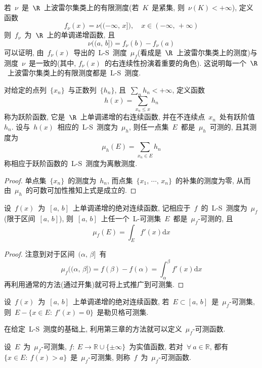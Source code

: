 \begin{Remark}
若~$\nu$~是~$\R$~上波雷尔集类上的有限测度(若~$K$~是紧集, 则~$\nu(K)<+\infty$), 定义函数
\[
f_\nu(x)=\nu\big( (-\infty,\,x] \big), \quad x \in(-\infty,\, +\infty)
\]
则~$f_\nu$~为~$\R$~上的单调递增函数, 且
\[
\nu\big( (a,\,b]\big) = f_\nu(b)-f_\nu(a)
\]
可以证明, 由~$f_\nu(x)$~导出的~L-S~测度~$\mu_f$(看成是~$\R$~上波雷尔集类上的测度)与测度~$\nu$~是一致的(其中, $f_\nu(x)$~的右连续性扮演着重要的角色).
这说明每一个~$\R$~上波雷尔集类上的有限测度都是~L-S~测度.
\end{Remark}

\begin{Example}
对给定的点列~$\{x_n\}$~与正数列~$\{h_n\}$, 且~$\sum\limits_n h_n < +\infty$, 定义函数
\[
h(x)=\sum_{x_n \leqslant x} h_n
\]
称为跃阶函数, 它是~$\R$~上单调递增的右连续函数, 并在不连续点~$x_n$~处有跃阶值~$h_n$.
设与~$h(x)$~相应的~L-S~测度为~$\mu_h$, 则任一点集~$E$~都是~$\mu_h$~可测的, 且其测度为
\[
\mu_h(E)=\sum_{x_n \in E} h_n
\]
称相应于跃阶函数的~L-S~测度为离散测度.
\end{Example}

\begin{proof}
单点集~$\{x_n\}$~的测度为~$h_n$, 而点集~$\{x_1,\,\cdots,\,x_n\}$~的补集的测度为零, 从而由~$\mu_h$~的可数可加性推知上式是成立的.
\end{proof}

\begin{Example}
设~$f(x)$~为~$[a,\,b]$~上单调递增的绝对连续函数, 记相应于~$f$~的~L-S~测度为~$\mu_f$
(限于区间~$[a,\,b]$), 则~$[a,\,b]$~上任一个~L-可测集~$E$~都是~$\mu_f$-可测的, 且
\[
\mu_f(E)=\int_E f'(x) \mathrm{d} x
\]
\end{Example}

\begin{proof}
注意到对于区间~$(\alpha,\,\beta]$~有
\[
\mu_f\big( (\alpha,\,\beta] \big) = f(\beta)-f(\alpha) = \int_\alpha^\beta f'(x) \mathrm{d} x
\]
再利用通常的方法(通过开集)就可将上式推广到可测集.
\end{proof}

\begin{Example}
设~$f(x)$~为~$[a,\,b]$~上单调递增的绝对连续函数, 若~$E \subset [a,\,b]$~是~$\mu_f$-可测集, 则~$E-\{x \in E: \: f'(x) = 0\}$~是勒贝格可测集.
\end{Example}

在给定~L-S~测度的基础上, 利用第三章的方法就可以定义~$\mu_f$-可测函数.

\begin{Definition}
设~$E$~为~$\mu_f$-可测集, $f: \: E \to \mathbb{R} \cup \{\pm \infty\}$~为实值函数, 若对~$\forall~a \in \mathbb{R}$, 都有~$\{x \in E: \: f(x) > a\}$~是~$\mu_f$-可测集, 则称~$f$~为~$\mu_f$-可测函数.
\end{Definition}

